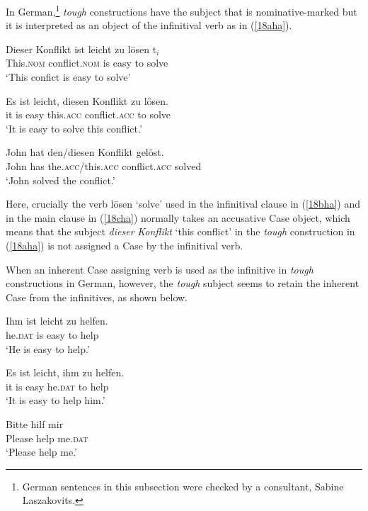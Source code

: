 \documentclass[output=paper,colorlinks,citecolor=brown,
]{langscibook}
\begin{document}
In German,\footnote{German sentences in this subsection were checked by a consultant, Sabine Laszakovits.} \textit{tough} constructions have the subject that is nominative-marked but it is interpreted as an object of the infinitival verb as in (\ref{18aha}).

\begin{exe}
\ex \label{18ha}
\begin{xlist}
\ex \label{18aha}
\gll Dieser Konflikt ist  leicht zu lösen t$_{i}$\\
This.\textsc{nom} conflict.\textsc{nom} is easy to solve\\
\glt ‘This confict is easy to solve’                             

\ex \label{18bha}
\gll Es ist leicht, diesen Konflikt zu lösen.\\
it is easy this.\textsc{acc} conflict.\textsc{acc} to solve\\
\glt ‘It is easy to solve this conflict.'

\ex \label{18cha}
\gll John hat den/diesen  Konflikt gelöst.\\
John has the.\textsc{acc}/this.\textsc{acc} conflict.\textsc{acc} solved\\
\glt ‘John solved the conflict.’

\end{xlist}
\end{exe}

Here, crucially the verb lösen ‘solve’ used in the infinitival clause in (\ref{18bha}) and in the main clause in (\ref{18cha}) normally takes an accusative Case object, which means that the subject \textit{dieser} \textit{Konflikt} ‘this conflict’ in the \textit{tough} construction in (\ref{18aha}) is not assigned a Case by the infinitival verb.

When an inherent Case assigning verb is used as the infinitive in \textit{tough} constructions in German, however, the \textit{tough} subject seems to retain the inherent Case from the infinitives, as shown below.

\begin{exe}
\ex \label{19ha}
\begin{xlist}
\ex \label{19aha}
\gll Ihm ist leicht zu helfen.\\
he.\textsc{dat} is easy to help\\
\glt ‘He is easy to help.’

\ex \label{19bha}
\gll Es ist leicht, ihm zu helfen.\\
it is easy he.\textsc{dat} to help\\
\glt ‘It is easy to help him.’

\end{xlist}

\ex \label{20ha}
\gll Bitte   hilf   mir\\
Please help me.\textsc{dat}\\
\glt ‘Please help me.’
\end{exe}
\end{document}
